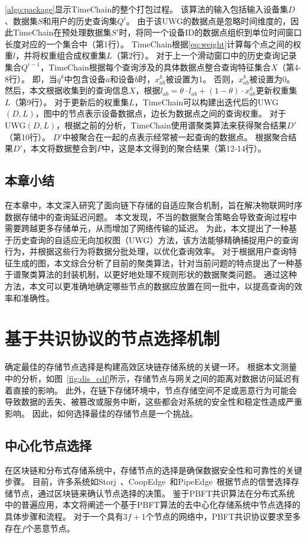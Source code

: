 \ref{algo:package}显示TimeChain的整个打包过程。
该算法的输入包括输入设备集$D$、数据集$S$和用户的历史查询集$Q^i$。
由于该UWG的数据点是忽略时间维度的，因此TimeChain在预处理数据集$S'$时，将同一个设备ID的数据点组织到单位时间窗口长度对应的一个集合中（第1行）。
TimeChain根据\autoref{eq:weight}计算每个点之间的权重$l$，并将权重组合成权重集$L$（第2行）。
对于上一个滑动窗口中的历史查询记录集合$Q^{i-1}$，TimeChain根据每个查询涉及的具体数据点整合查询特征集合$X$（第4-8行）。
即，当$q^k$中包含设备$a$和设备$b$时，$x^k_{ab}$被设置为1。
否则，$x^k_{ab}$被设置为0。
然后，本文根据收集到的查询信息$X$，根据$l_{ab} = \theta \cdot l_{ab} + (1 - \theta) \cdot x_{ab}^k$更新权重集$L$（第9行）。
对于更新后的权重集$L$，TimeChain可以构建出迭代后的UWG$(D,L)$，图中的节点表示设备数据点，边长为数据点之间的查询权重。
对于UWG$(D,L)$，根据之前的分析，TimeChain使用谱聚类算法来获得聚合结果$D'$（第10行）。
$D'$中被聚合在一起的点表示经常被一起查询的数据点。
根据聚合结果$D'$，本文将数据整合到$P$中，这是本文得到的聚合结果（第12-14行）。

\section{本章小结}
在本章中，本文深入研究了面向链下存储的自适应聚合机制，旨在解决物联网时序数据存储中的查询延迟问题。
本文发现，不当的数据聚合策略会导致查询过程中需要跨越更多存储单元，从而增加了网络传输的延迟。
为此，本文提出了一种基于历史查询的自适应无向加权图（UWG）方法，该方法能够精确捕捉用户的查询行为，并根据这些行为将数据分批处理，以优化查询效率。
对于根据用户查询特征生成的图，本文综合分析了目前的聚类算法，针对当前问题的特点提出了一种基于谱聚类算法的封装机制，以更好地处理不规则形状的数据聚类问题。
通过这种方法，本文可以更准确地确定哪些节点的数据应放置在同一批中，以提高查询的效率和准确性。

\chapter{基于共识协议的节点选择机制}
\label{sec:consensus}
确定最佳的存储节点选择是构建高效区块链存储系统的关键一环。
根据本文测量中的分析，如图~\autoref{fig:dis_cdf}所示，存储节点与网关之间的距离对数据访问延迟有着直接的影响。
此外，在链下存储环境中，节点存储空间不足或恶意行为可能会导致数据的丢失、被篡改或服务中断，这些都会对系统的安全性和稳定性造成严重影响。
因此，如何选择最佳的存储节点是一个挑战。

\section{中心化节点选择}
在区块链和分布式存储系统中，存储节点的选择是确保数据安全性和可靠性的关键步骤。
目前，许多系统如Storj~\cite{storj2018storj}、CoopEdge~\cite{yuan2021coopedge}和PipeEdge~\cite{yuan2023pipeedge}根据节点的信誉选择存储节点，通过区块链来确认节点选择的决策。
鉴于PBFT共识算法在分布式系统中的普遍应用，本文将阐述一个基于PBFT算法的去中心化存储系统中节点选择的具体步骤和流程。
对于一个具有$3f+1$个节点的网络中，PBFT共识协议要求至多存在$f$个恶意节点。

